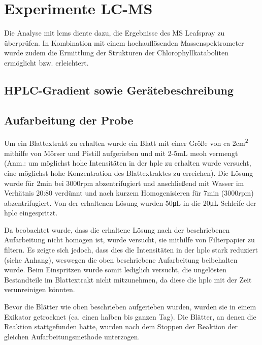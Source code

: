 \chapter{Experimente LC-MS} 

Die Analyse mit \gls{lcms} diente dazu, die Ergebnisse des MS Leafspray zu überprüfen. In Kombination mit einem hochauflösenden Massenspektrometer wurde zudem die Ermittlung der Strukturen der Chlorophyllkataboliten ermöglicht bzw. erleichtert.\\

\section{HPLC-Gradient sowie Gerätebeschreibung} \label{sec:HPLCAufarbeitungderProbe} 

\section{Aufarbeitung der Probe} \label{sec:HPLCAufarbeitungderProbe}

Um ein Blattextrakt zu erhalten wurde ein Blatt mit einer Größe von \gls{ca} 2\si{cm^{2}} mithilfe von Mörser und Pistill aufgerieben und mit 2-5mL \gls{meoh} vermengt (Anm.: um möglichst hohe Intensitäten in der \gls{hplc} zu erhalten wurde versucht, eine möglichst hohe Konzentration des Blattextraktes zu erreichen). Die Lösung wurde für 2min bei 3000rpm abzentrifugiert und anschließend mit Wasser im Verhätnis 20:80 verdünnt und nach kurzem Homogenisieren für 7min (3000rpm) abzentrifugiert. Von der erhaltenen Lösung wurden 50\si{\uL} in die 20\si{\uL} Schleife der \gls{hplc} eingespritzt. 

Da beobachtet wurde, dass die erhaltene Lösung nach der beschriebenen Aufarbeitung nicht homogen ist, wurde versucht, sie mithilfe von Filterpapier zu filtern. Es zeigte sich jedoch, dass dies die Intensitäten in der \gls{hplc} stark reduziert (siehe Anhang), weswegen die oben beschriebene Aufarbeitung beibehalten wurde. Beim Einspritzen wurde somit lediglich versucht, die ungelösten Bestandteile im Blattextrakt nicht mitzunehmen, da diese die \gls{hplc} mit der Zeit verunreinigen könnten.

Bevor die Blätter wie oben beschrieben aufgerieben wurden, wurden sie in einem Exikator getrocknet (ca. einen halben bis ganzen Tag). Die Blätter, an denen die Reaktion stattgefunden hatte, wurden nach dem Stoppen der Reaktion  der gleichen Aufarbeitungsmethode unterzogen. 

